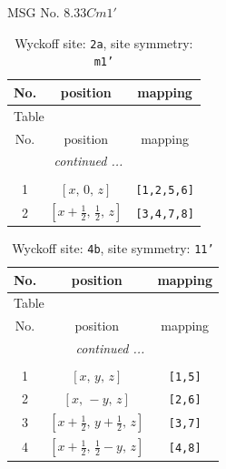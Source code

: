 \documentclass[fleqn,8pt]{jsarticle}
\begin{document}
\setcounter{MaxMatrixCols}{32}

\renewcommand{\tablename}{Table~}
\renewcommand{\figurename}{Figure~}
\begin{center}
\LARGE
MSG No. 8.33\quad$Cm1'$
\end{center}
\renewcommand{\arraystretch}{1.2}
\begin{longtable}{ccc}
\caption{Wyckoff site: {\tt 2a}, site symmetry: {\tt m1'}}
 \\
 \hline \hline
No. & position & mapping \\ \hline \endfirsthead

\multicolumn{2}{l}{\tablename\ \thetable{}} \\
 \hline \hline
No. & position & mapping \\ \hline \endhead

 \hline \hline
\multicolumn{2}{r}{\footnotesize\it continued ...} \\ \endfoot

 \hline \hline
\multicolumn{2}{r}{} \\ \endlastfoot

1 & $\left[ x,\, 0,\, z \right]$ & {\tt [1,2,5,6]} \\ \hline
2 & $\left[ x + \frac{1}{2},\, \frac{1}{2},\, z \right]$ & {\tt [3,4,7,8]} \\
\end{longtable}
\renewcommand{\arraystretch}{1.2}
\begin{longtable}{ccc}
\caption{Wyckoff site: {\tt 4b}, site symmetry: {\tt 11'}}
 \\
 \hline \hline
No. & position & mapping \\ \hline \endfirsthead

\multicolumn{2}{l}{\tablename\ \thetable{}} \\
 \hline \hline
No. & position & mapping \\ \hline \endhead

 \hline \hline
\multicolumn{2}{r}{\footnotesize\it continued ...} \\ \endfoot

 \hline \hline
\multicolumn{2}{r}{} \\ \endlastfoot

1 & $\left[ x,\, y,\, z \right]$ & {\tt [1,5]} \\ \hline
2 & $\left[ x,\, - y,\, z \right]$ & {\tt [2,6]} \\ \hline
3 & $\left[ x + \frac{1}{2},\, y + \frac{1}{2},\, z \right]$ & {\tt [3,7]} \\ \hline
4 & $\left[ x + \frac{1}{2},\, \frac{1}{2} - y,\, z \right]$ & {\tt [4,8]} \\
\end{longtable}
\end{document}
